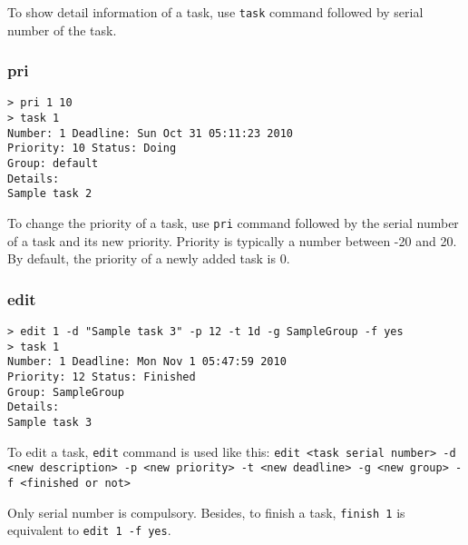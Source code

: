 \documentclass[12pt, a4paper]{article}
\begin{document}
To show detail information of a task, use \texttt{task} command followed by serial number of the task.

\subsubsection{pri}

\noindent \texttt{\textgreater \  pri 1 10\\
  \textgreater \ task 1\\
  Number:  1       Deadline:   Sun Oct 31 05:11:23 2010\\
  Priority:  10        Status:   Doing\\
  Group:  default\\
  Details:\\
  Sample task 2}

To change the priority of a task, use \texttt{pri} command followed by the serial number of a task and its new priority.
Priority is typically a number between -20 and 20. By default, the priority of a newly added task is 0.

\subsubsection{edit}

\noindent \texttt{\textgreater \ edit 1 -d "Sample task 3" -p 12 -t 1d\footnotemark \ -g SampleGroup -f yes\\
  \textgreater \ task 1\\
  Number:  1       Deadline:   Mon Nov  1 05:47:59 2010\\
  Priority:  12        Status:   Finished\\
  Group:  SampleGroup\\
  Details:\\
  Sample task 3}

To edit a task, \texttt{edit} command is used like this:
\texttt{edit \textless task serial number\textgreater \ -d \textless new description\textgreater \ -p \textless new priority\textgreater \ -t \textless new deadline\textgreater \ -g \textless new group\textgreater \ -f \textless finished or not\textgreater}

Only serial number is compulsory. Besides, to finish a task, \texttt{finish 1} is equivalent to \texttt{edit 1 -f yes}.

\end{document}

